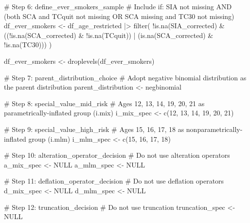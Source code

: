 \documentclass[aoas]{imsart}
\makeatletter
\newenvironment{Shaded}{\begin{snugshade}}{\end{snugshade}}
\newcommand{\CommentTok}[1]{\textcolor[rgb]{0.37,0.37,0.37}{#1}}
\newcommand{\ConstantTok}[1]{\textcolor[rgb]{0.56,0.35,0.01}{#1}}
\newcommand{\DecValTok}[1]{\textcolor[rgb]{0.68,0.00,0.00}{#1}}
\newcommand{\FunctionTok}[1]{\textcolor[rgb]{0.28,0.35,0.67}{#1}}
\newcommand{\NormalTok}[1]{\textcolor[rgb]{0.00,0.23,0.31}{#1}}
\newcommand{\OtherTok}[1]{\textcolor[rgb]{0.00,0.23,0.31}{#1}}
\newcommand{\SpecialCharTok}[1]{\textcolor[rgb]{0.37,0.37,0.37}{#1}}
\renewenvironment{Shaded}{}{}
\renewenvironment{codelisting}{%
    \def\@captype{codelisting}%
    \par\addvspace{0.5em}\noindent
  }{%
    \par\addvspace{0.5em}%
  }%
\makeatother
\begin{document}
\begin{codelisting}
{\begin{Shaded}
\begin{Highlighting}[]
\CommentTok{\# Step 6: define\_ever\_smokers\_sample}
\CommentTok{\# Include if: SIA not missing AND (both SCA and TCquit not missing OR SCA missing and TC30 not missing)}
\NormalTok{df\_ever\_smokers }\OtherTok{\textless{}{-}}\NormalTok{ df\_age\_restricted }\SpecialCharTok{|\textgreater{}}
  \FunctionTok{filter}\NormalTok{(}
    \SpecialCharTok{!}\FunctionTok{is.na}\NormalTok{(SIA\_corrected) }\SpecialCharTok{\&}
\NormalTok{    ((}\SpecialCharTok{!}\FunctionTok{is.na}\NormalTok{(SCA\_corrected) }\SpecialCharTok{\&} \SpecialCharTok{!}\FunctionTok{is.na}\NormalTok{(TCquit)) }\SpecialCharTok{|}\NormalTok{ (}\FunctionTok{is.na}\NormalTok{(SCA\_corrected) }\SpecialCharTok{\&} \SpecialCharTok{!}\FunctionTok{is.na}\NormalTok{(TC30)))}
\NormalTok{  )}

\NormalTok{df\_ever\_smokers }\OtherTok{\textless{}{-}} \FunctionTok{droplevels}\NormalTok{(df\_ever\_smokers)}

\CommentTok{\# Step 7: parent\_distribution\_choice}
\CommentTok{\# Adopt negative binomial distribution as the parent distribution}
\NormalTok{parent\_distribution }\OtherTok{\textless{}{-}}\NormalTok{ negbinomial}

\CommentTok{\# Step 8: special\_value\_mid\_risk}
\CommentTok{\# Ages 12, 13, 14, 19, 20, 21 as parametrically{-}inflated group (i.mix)}
\NormalTok{i\_mix\_spec }\OtherTok{\textless{}{-}} \FunctionTok{c}\NormalTok{(}\DecValTok{12}\NormalTok{, }\DecValTok{13}\NormalTok{, }\DecValTok{14}\NormalTok{, }\DecValTok{19}\NormalTok{, }\DecValTok{20}\NormalTok{, }\DecValTok{21}\NormalTok{)}

\CommentTok{\# Step 9: special\_value\_high\_risk}
\CommentTok{\# Ages 15, 16, 17, 18 as nonparametrically{-}inflated group (i.mlm)}
\NormalTok{i\_mlm\_spec }\OtherTok{\textless{}{-}} \FunctionTok{c}\NormalTok{(}\DecValTok{15}\NormalTok{, }\DecValTok{16}\NormalTok{, }\DecValTok{17}\NormalTok{, }\DecValTok{18}\NormalTok{)}

\CommentTok{\# Step 10: alteration\_operator\_decision}
\CommentTok{\# Do not use alteration operators}
\NormalTok{a\_mix\_spec }\OtherTok{\textless{}{-}} \ConstantTok{NULL}
\NormalTok{a\_mlm\_spec }\OtherTok{\textless{}{-}} \ConstantTok{NULL}

\CommentTok{\# Step 11: deflation\_operator\_decision}
\CommentTok{\# Do not use deflation operators}
\NormalTok{d\_mix\_spec }\OtherTok{\textless{}{-}} \ConstantTok{NULL}
\NormalTok{d\_mlm\_spec }\OtherTok{\textless{}{-}} \ConstantTok{NULL}

\CommentTok{\# Step 12: truncation\_decision}
\CommentTok{\# Do not use truncation}
\NormalTok{truncation\_spec }\OtherTok{\textless{}{-}} \ConstantTok{NULL}


\end{Highlighting}
\end{Shaded}}
\end{codelisting}
\end{document}
